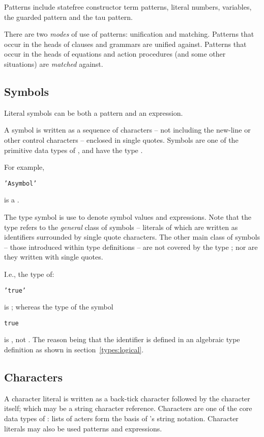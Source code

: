 Patterns include statefree constructor term patterns, literal numbers, variables, the guarded pattern and the tau pattern. 

There are two \emph{modes} of use of patterns: unification and matching. Patterns that occur in the heads of clauses and grammars are unified against. Patterns that occur in the heads of equations and action procedures (and some other situations) are \emph{matched} against. 


\subsection{Symbols}
\label{expression:symbol}

Literal symbols can be both a pattern and an expression. 

A symbol is written as a sequence of characters -- not including the new-line or other control characters -- enclosed in single quotes. Symbols are one of the primitive data types of \go, and have the type .

For example, 
\begin{alltt}
'A symbol'
\end{alltt}
is a .

The  type symbol is use to denote symbol values and expressions. Note that the  type refers to the \emph{general} class of symbols -- literals of which are written as identifiers surrounded by single quote characters. The other main class of symbols -- those introduced within type definitions -- are not covered by the type ; nor are they written with single quotes.

I.e., the type of:
\begin{alltt}
'true'
\end{alltt}
is ; whereas the type of the symbol
\begin{alltt}
true
\end{alltt}
is , not . The reason being that the  identifier is defined in an algebraic type definition as shown in section~\vref{types:logical}. 

\subsection{Characters}
\label{expression:character}

A character literal is written as a back-tick character followed by the character itself; which may be a string character reference. Characters are one of the core data types of \go: lists of acters form the basis of \go's string notation. Character literals may also be used patterns and expressions.

